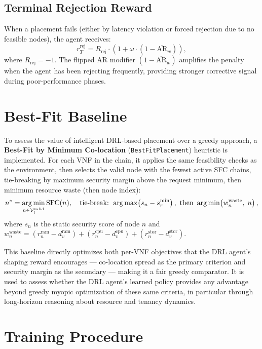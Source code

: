 \subsection{Terminal Rejection Reward}

When a placement fails (either by latency violation or forced rejection due to no feasible nodes), the agent receives:
\begin{equation}
r_T^{\text{rej}} = R_{\text{rej}} \cdot \left(1 + \omega \cdot (1 - \overline{\text{AR}}_w)\right),
\end{equation}
where $R_{\text{rej}} = -1$. The flipped AR modifier $(1 - \overline{\text{AR}}_w)$ amplifies the penalty when the agent has been rejecting frequently, providing stronger corrective signal during poor-performance phases.

\section{Best-Fit Baseline}

To assess the value of intelligent DRL-based placement over a greedy approach, a \textbf{Best-Fit by Minimum Co-location} (\texttt{BestFitPlacement}) heuristic is implemented. For each VNF in the chain, it applies the same feasibility checks as the environment, then selects the valid node with the fewest active SFC chains, tie-breaking by maximum security margin above the request minimum, then minimum resource waste (then node index):
\begin{equation}
n^* = \operatorname*{arg\,min}_{n \in \mathcal{V}_t^{\text{valid}}} \text{SFC}(n), \quad \text{tie-break: } \operatorname*{arg\,max}\!\left(s_n - s_r^{\min}\right), \text{ then } \operatorname*{arg\,min}\!\left(w_n^{\text{waste}},\; n\right),
\end{equation}
where $s_n$ is the static security score of node $n$ and $w_n^{\text{waste}} = (r_n^{\text{ram}} - d_v^{\text{ram}}) + (r_n^{\text{cpu}} - d_v^{\text{cpu}}) + (r_n^{\text{stor}} - d_v^{\text{stor}})$.

This baseline directly optimizes both per-VNF objectives that the DRL agent's shaping reward encourages --- co-location spread as the primary criterion and security margin as the secondary --- making it a fair greedy comparator. It is used to assess whether the DRL agent's learned policy provides any advantage beyond greedy myopic optimization of these same criteria, in particular through long-horizon reasoning about resource and tenancy dynamics.

\section{Training Procedure}

